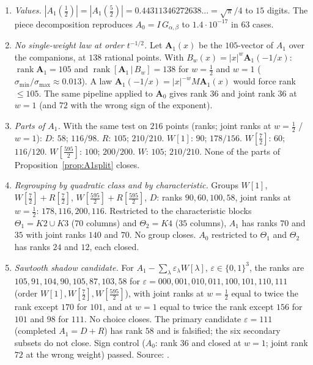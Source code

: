 \begin{enumerate}[label=D.\arabic*,leftmargin=3em]
formula disagrees by relative errors $0.25$ to $2.92$ at the seven points where $|\mathsf C|>0.05$.
\item\label{catB:o2val} \emph{Values.} $|A_1(\frac12)|=|A_1(\frac52)|=0.44311346272638\ldots=\sqrt\pi/4$ to $15$ digits. The piece decomposition reproduces
$A_0=I\,G_{\alpha,\beta}$ to $1.4\cdot10^{-17}$ in $63$ cases.
\item\label{catB:map3} \emph{No single-weight law at order $t^{-1/2}$.} Let $\mathbf A_1(x)$ be the $105$-vector of $A_1$ over the companions, at $138$ rational points.
With $B_w(x)=|x|^{w}\mathbf A_1(-1/x)$: $\operatorname{rank}\mathbf A_1=105$ and $\operatorname{rank}[\mathbf A_1\,|\,B_w]=138$ for $w=\frac12$ and $w=1$
($\sigma_{\min}/\sigma_{\max}\approx0.013$). A law $\mathbf A_1(-1/x)=|x|^{-w}M\mathbf A_1(x)$ would force rank $\le105$. The same pipeline applied to $\mathbf A_0$ gives
rank $36$ and joint rank $36$ at $w=1$ (and $72$ with the wrong sign of the exponent).
\item\label{catB:o3} \emph{Parts of $A_1$.} With the same test on $216$ points (ranks; joint ranks at $w=\frac12$ / $w=1$): $D$: $58$; $116/98$. $R$: $105$; $210/210$.
$W[1]$: $90$; $178/156$. $W[\frac72]$: $60$; $116/120$. $W[\frac{595}2]$: $100$; $200/200$. $W$: $105$; $210/210$. None of the parts of Proposition~\ref{prop:A1split}
closes.
\item\label{catB:o3b} \emph{Regrouping by quadratic class and by characteristic.} Groups $W[1]$, $W[\frac72]+R[\frac72]$, $W[\frac{595}2]+R[\frac{595}2]$, $D$: ranks
$90,60,100,58$, joint ranks at $w=\frac12$: $178,116,200,116$. Restricted to the characteristic blocks $\Theta_1=K2\cup K3$ ($70$ columns) and $\Theta_2=K4$ ($35$ columns),
$A_1$ has ranks $70$ and $35$ with joint ranks $140$ and $70$. No group closes. $A_0$ restricted to $\Theta_1$ and $\Theta_2$ has ranks $24$ and $12$, each closed.
\item\label{catB:4a} \emph{Sawtooth shadow candidate.} For $A_1-\sum_\lambda\varepsilon_\lambda W[\lambda]$, $\varepsilon\in\{0,1\}^3$, the ranks are
$105,91,104,90,105,87,103,58$ for $\varepsilon=000,001,010,011,100,101,110,111$ (order $W[1],W[\frac72],W[\frac{595}2]$), with joint ranks at $w=\frac12$ equal to twice the rank
except $170$ for $101$, and at $w=1$ equal to twice the rank except $156$ for $101$ and $98$ for $111$. No choice closes. The primary candidate $\varepsilon=111$ (completed $A_1=D+R$) has rank $58$ and is falsified; the six secondary subsets do not close.
Sign control ($A_0$: rank $36$ and closed at $w=1$; joint rank $72$ at the wrong weight) passed. Source: .

\end{enumerate}
